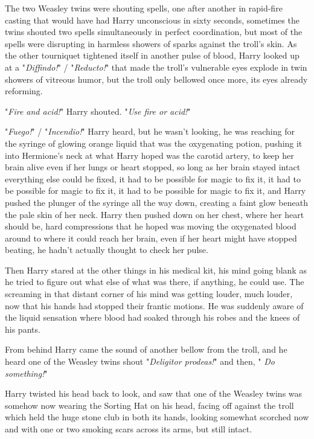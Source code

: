 The two Weasley twins were shouting spells, one after another in rapid-fire
casting that would have had Harry unconscious in sixty seconds, sometimes the
twins shouted two spells simultaneously in perfect coordination, but most of
the spells were disrupting in harmless showers of sparks against the troll's
skin. As the other tourniquet tightened itself in another pulse of blood, Harry
looked up at a "\emph{Diffindo!}" / "\emph{Reducto!}" that made the troll's vulnerable
eyes explode in twin showers of vitreous humor, but the troll only bellowed
once more, its eyes already reforming.

"\emph{Fire and acid!}" Harry shouted. "\emph{Use fire or acid!}"

"\emph{Fuego!}" / "\emph{Incendio!}" Harry heard, but he wasn't looking, he was
reaching for the syringe of glowing orange liquid that was the oxygenating
potion, pushing it into Hermione's neck at what Harry hoped was the carotid
artery, to keep her brain alive even if her lungs or heart stopped, so long as
her brain stayed intact everything else could be fixed, it had to be possible
for magic to fix it, it had to be possible for magic to fix it, it had to be
possible for magic to fix it, and Harry pushed the plunger of the syringe all
the way down, creating a faint glow beneath the pale skin of her neck. Harry
then pushed down on her chest, where her heart should be, hard compressions
that he hoped was moving the oxygenated blood around to where it could reach
her brain, even if her heart might have stopped beating, he hadn't actually
thought to check her pulse.

Then Harry stared at the other things in his medical kit, his mind going blank
as he tried to figure out what else of what was there, if anything, he could
use. The screaming in that distant corner of his mind was getting louder, much
louder, now that his hands had stopped their frantic motions. He was suddenly
aware of the liquid sensation where blood had soaked through his robes and the
knees of his pants.

From behind Harry came the sound of another bellow from the troll, and he heard
one of the Weasley twins shout "\emph{Deligitor prodeas!}" and then,
"\emph{ Do something!}"

Harry twisted his head back to look, and saw that one of the Weasley twins was
somehow now wearing the Sorting Hat on his head, facing off against the troll
which held the huge stone club in both its hands, looking somewhat scorched now
and with one or two smoking scars across its arms, but still intact.

